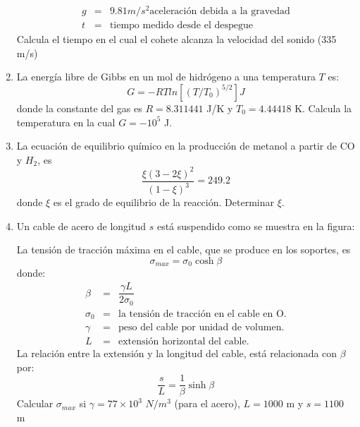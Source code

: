 \documentclass[11pt]{article}
\begin{document}
\begin{enumerate}
\begin{eqnarray*}
g &=& 9.81 m/s^{2} \text{aceleraci\'{o}n debida a la gravedad} \\
t &=& \text{tiempo medido desde el despegue}
\end{eqnarray*}
Calcula el tiempo en el cual el cohete alcanza la velocidad del sonido (335 m/s)
\item La energ\'{i}a libre de Gibbs en un mol de hidr\'{o}geno a una temperatura $T$ es:
\[ G = -RT ln [(T/T_{0})^{5/2}] J \]
donde la constante del gas es $R=8.311441$ J/K y $T_{0}=4.44418$ K. Calcula la temperatura en la cual $G=-10^{5}$ J.
\item La ecuaci\'{o}n de equilibrio qu\'{i}mico en la producci\'{o}n de metanol a partir de CO y $H_{2}$, es
\[ \dfrac{\xi (3-2 \xi)^{2}}{(1-\xi)^{3}} = 249.2\]
donde $\xi$ es el grado de equilibrio de la reacción. Determinar $\xi$.
\item Un cable de acero de longitud $s$ est\'{a} suspendido como se muestra en la figura:
\begin{center}
\end{center}
La tensi\'{o}n de tracci\'{o}n m\'{a}xima en el cable, que se produce en los soportes, es
\[ \sigma_{max} = \sigma_{0} \cosh \beta \]
donde:
\begin{eqnarray*}
\beta &=& \dfrac{\gamma L}{2 \sigma_{0}} \\
\sigma_{0} &=& \mbox{la tensi\'{o}n de tracci\'{o}n en el cable en O.} \\
\gamma &=& \mbox{peso del cable por unidad de volumen.} \\
L &=& \mbox{extensi\'{o}n horizontal del cable.} 
\end{eqnarray*}
La relaci\'{o}n entre la extensi\'{o}n y la longitud del cable, est\'{a} relacionada con $\beta$ por:
\[ \dfrac{s}{L} = \dfrac{1}{\beta} \sinh \beta\]
Calcular $\sigma_{max}$ si $\gamma = 77 \times 10^{3}$ $N/m^{3}$ (para el acero), $L=1000$ m y $s=1100$ m
\end{enumerate}
\end{document}
